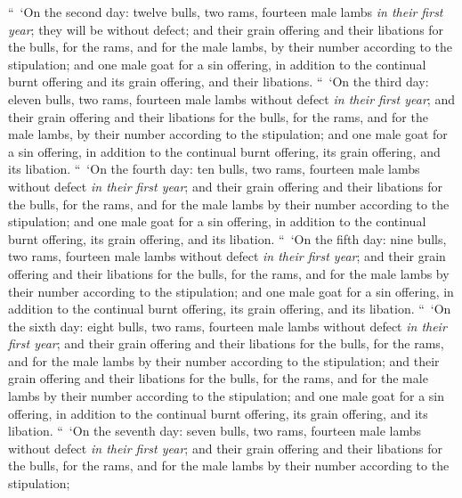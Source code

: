 \begin{biblechapter}
\verse “ ‘On the second day: twelve bulls, two rams, fourteen male lambs \textit{in their first year}; they will be without defect;
\verse and their grain offering and their libations for the bulls, for the rams, and for the male lambs, by their number according to the stipulation;
\verse and one male goat for a sin offering, in addition to the continual burnt offering and its grain offering, and their libations.
\verse “ ‘On the third day: eleven bulls, two rams, fourteen male lambs without defect \textit{in their first year};
\verse and their grain offering and their libations for the bulls, for the rams, and for the male lambs, by their number according to the stipulation;
\verse and one male goat for a sin offering, in addition to the continual burnt offering, its grain offering, and its libation.
\verse “ ‘On the fourth day: ten bulls, two rams, fourteen male lambs without defect \textit{in their first year};
\verse and their grain offering and their libations for the bulls, for the rams, and for the male lambs by their number according to the stipulation;
\verse and one male goat for a sin offering, in addition to the continual burnt offering, its grain offering, and its libation.
\verse “ ‘On the fifth day: nine bulls, two rams, fourteen male lambs without defect \textit{in their first year};
\verse and their grain offering and their libations for the bulls, for the rams, and for the male lambs by their number according to the stipulation;
\verse and one male goat for a sin offering, in addition to the continual burnt offering, its grain offering, and its libation.
\verse “ ‘On the sixth day: eight bulls, two rams, fourteen male lambs without defect \textit{in their first year}; and their grain offering and their libations for the bulls, for the rams, and for the male lambs by their number according to the stipulation;
\verse and their grain offering and their libations for the bulls, for the rams, and for the male lambs by their number according to the stipulation;
\verse and one male goat for a sin offering, in addition to the continual burnt offering, its grain offering, and its libation.
\verse “ ‘On the seventh day: seven bulls, two rams, fourteen male lambs without defect \textit{in their first year};
\verse and their grain offering and their libations for the bulls, for the rams, and for the male lambs by their number according to the stipulation;

\end{biblechapter}
